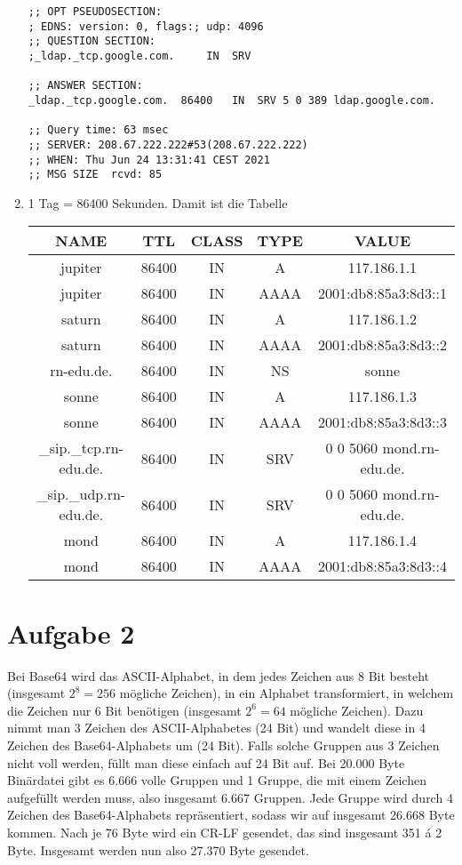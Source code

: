 \documentclass{article}
\begin{document}
\begin{enumerate}[label=(\alph*)]
\begin{lstlisting}[tabsize=2]
;; OPT PSEUDOSECTION:
; EDNS: version: 0, flags:; udp: 4096
;; QUESTION SECTION:
;_ldap._tcp.google.com.		IN	SRV

;; ANSWER SECTION:
_ldap._tcp.google.com.	86400	IN	SRV	5 0 389 ldap.google.com.

;; Query time: 63 msec
;; SERVER: 208.67.222.222#53(208.67.222.222)
;; WHEN: Thu Jun 24 13:31:41 CEST 2021
;; MSG SIZE  rcvd: 85
		\end{lstlisting}
		\item 1 Tag = 86400 Sekunden. Damit ist die Tabelle
		\begin{center}
			\begin{tabular}{c|c|c|c|c}
				\textbf{NAME} & \textbf{TTL} & \textbf{CLASS} & \textbf{TYPE} & \textbf{VALUE} \\
				\hline
				jupiter & 86400 & IN & A & 117.186.1.1 \\
				jupiter & 86400 & IN & AAAA & 2001:db8:85a3:8d3::1 \\
				saturn & 86400 & IN & A & 117.186.1.2 \\
				saturn & 86400 & IN & AAAA & 2001:db8:85a3:8d3::2 \\
				rn-edu.de. & 86400 & IN & NS & sonne \\
				sonne & 86400 & IN & A & 117.186.1.3 \\
				sonne & 86400 & IN & AAAA & 2001:db8:85a3:8d3::3 \\
				\_sip.\_tcp.rn-edu.de. & 86400 & IN & SRV & 0 0 5060 mond.rn-edu.de. \\
				\_sip.\_udp.rn-edu.de. & 86400 & IN & SRV & 0 0 5060 mond.rn-edu.de. \\
				mond & 86400 & IN & A & 117.186.1.4 \\
				mond & 86400 & IN & AAAA & 2001:db8:85a3:8d3::4 \\
			\end{tabular}
		\end{center}
	\end{enumerate}

	\section*{Aufgabe 2}
	Bei Base64 wird das ASCII-Alphabet, in dem jedes Zeichen aus 8 Bit besteht (insgesamt $2^8=256$ mögliche Zeichen), in ein Alphabet transformiert, in welchem die Zeichen nur 6 Bit benötigen (insgesamt $2^6=64$ mögliche Zeichen). Dazu nimmt man 3 Zeichen des ASCII-Alphabetes (24 Bit) und wandelt diese in 4 Zeichen des Base64-Alphabets um (24 Bit). Falls solche Gruppen aus 3 Zeichen nicht voll werden, füllt man diese einfach auf 24 Bit auf. Bei 20.000 Byte Binärdatei gibt es 6.666 volle Gruppen und 1 Gruppe, die mit einem Zeichen aufgefüllt werden muss, also insgesamt 6.667 Gruppen. Jede Gruppe wird durch 4 Zeichen des Base64-Alphabets repräsentiert, sodass wir auf insgesamt 26.668 Byte kommen. Nach je 76 Byte wird ein CR-LF gesendet, das sind insgesamt 351 á 2 Byte. Insgesamt werden nun also 27.370 Byte gesendet.
	
\end{document}
